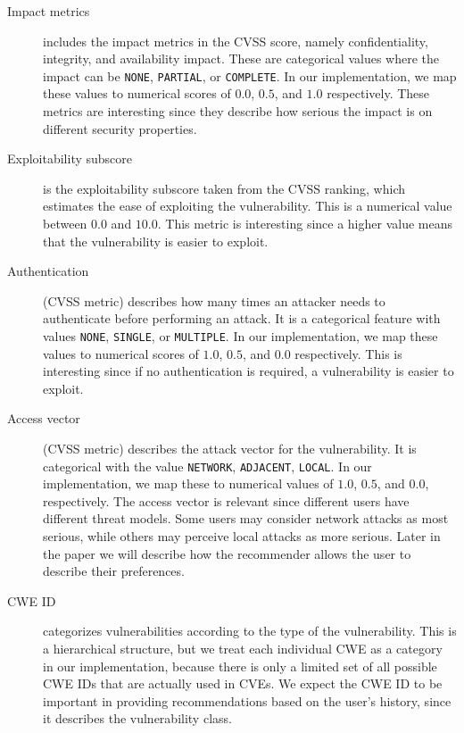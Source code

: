{\begin{description}
	\item[Impact metrics] includes the impact metrics in the CVSS score, namely confidentiality, integrity, and availability impact. These are categorical values where the impact can be \texttt{NONE}, \texttt{PARTIAL}, or \texttt{COMPLETE}. In our implementation, we map these values to numerical scores of $0.0$, $0.5$, and $1.0$ respectively. These metrics are interesting since they describe how serious the impact is on different security properties. %
	\item[Exploitability subscore] is the exploitability subscore taken from the CVSS ranking, which estimates the ease of exploiting the vulnerability. This is a numerical value between $0.0$ and $10.0$. This metric is interesting since a higher value means that the vulnerability is easier to exploit. %
	\item[Authentication] (CVSS metric) describes how many times an attacker needs to authenticate before performing an attack. It is a categorical feature with values \texttt{NONE}, \texttt{SINGLE}, or \texttt{MULTIPLE}. In our implementation, we map these values to numerical scores of $1.0$, $0.5$, and $0.0$ respectively. This is interesting since if no authentication is required, a vulnerability is easier to exploit.%
	\item[Access vector] (CVSS metric) describes the attack vector for the vulnerability. It is categorical with the value \texttt{NETWORK}, \texttt{ADJACENT}, \texttt{LOCAL}. In our implementation, we map these to numerical values of $1.0$, $0.5$, and $0.0$, respectively. The access vector is relevant since different users have different threat models. Some users may consider network attacks as most serious, while others may perceive local attacks as more serious. Later in the paper we will describe how the recommender allows the user to describe their preferences.
	\item[CWE ID] categorizes vulnerabilities according to the type of the vulnerability. This is a hierarchical structure, but we treat each individual CWE as a category in our implementation, because there is only a limited set of all possible CWE IDs that are actually used in CVEs. We expect the CWE ID to be important in providing recommendations based on the user's history, since it describes the vulnerability class.

\end{description}}
